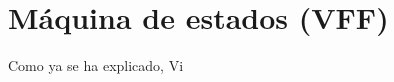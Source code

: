 \chapter{Máquina de estados (VFF)}
\label{cap:capitulo6}
Como ya se ha explicado, Vi
















